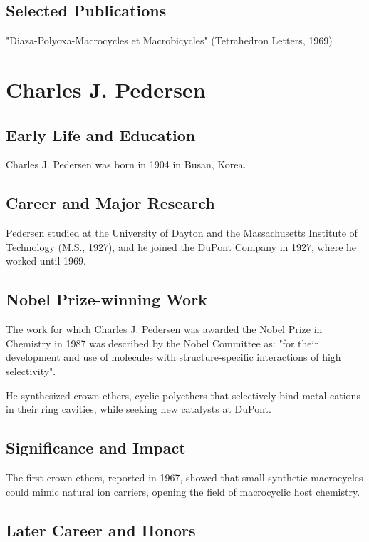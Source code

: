 \subsection*{Selected Publications}

"Diaza-Polyoxa-Macrocycles et Macrobicycles" (Tetrahedron Letters, 1969)

\clearpage

\section{Charles J. Pedersen}

\subsection*{Early Life and Education}

Charles J. Pedersen was born in 1904 in Busan, Korea.

\subsection*{Career and Major Research}

Pedersen studied at the University of Dayton and the Massachusetts Institute of Technology (M.S., 1927), and he joined the DuPont Company in 1927, where he worked until 1969.

\subsection*{Nobel Prize-winning Work}

The work for which Charles J. Pedersen was awarded the Nobel Prize in Chemistry in 1987 was described by the Nobel Committee as: "for their development and use of molecules with structure-specific interactions of high selectivity".

He synthesized crown ethers, cyclic polyethers that selectively bind metal cations in their ring cavities, while seeking new catalysts at DuPont.

\subsection*{Significance and Impact}

The first crown ethers, reported in 1967, showed that small synthetic macrocycles could mimic natural ion carriers, opening the field of macrocyclic host chemistry.

\subsection*{Later Career and Honors}

